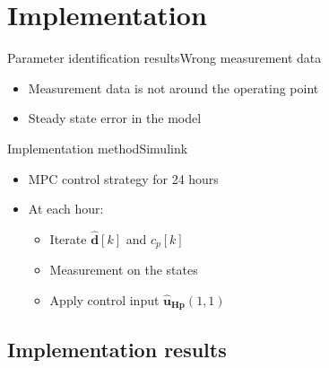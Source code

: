 \section{Implementation}

\begin{frame}{Parameter identification results}{Wrong measurement data}

\begin{itemize}
	 	\item<1-> Measurement data is not around the operating point
	 	\item<1-> Steady state error in the model
	 	\end{itemize}

\begin{figure}[H]
   \centering
    
\end{figure}

\begin{figure}[H]
   \centering
    
\end{figure}

\end{frame}

\begin{frame}{Implementation method}{Simulink}
\begin{itemize}
\item<1-> MPC control strategy for 24 hours
\item<1-> At each hour:
	 	\begin{itemize}
	 	\item<1-> Iterate $\hat{\pmb{d}}[k]$ and $c_p [k]$
	 	\item<1-> Measurement on the states 
	 	\item<1-> Apply control input $\pmb{\hat{u}_{Hp}}(1,1)$
	 	\end{itemize}
\end{itemize}

\begin{figure}[H]
\centering
 
\end{figure}

\end{frame}


\subsection{Implementation results}

